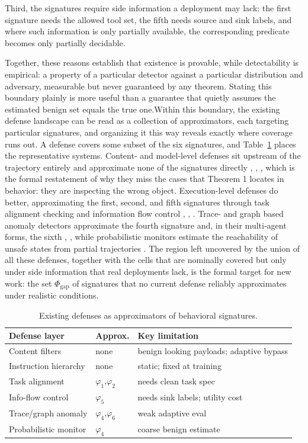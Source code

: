 \documentclass[journal]{IEEEtran}
\theoremstyle{remark}
\begin{document}
Third, the signatures require side information a deployment may lack: the first signature needs the allowed tool set, the fifth needs source and sink labels, and where such information is only partially available, the corresponding predicate becomes only partially decidable.

Together, these reasons establish that existence is provable, while detectability is empirical: a property of a particular detector against a particular distribution and adversary, measurable but never guaranteed by any theorem. Stating this boundary plainly is more useful than a guarantee that quietly assumes the estimated benign set equals the true one.Within this boundary, the existing defense landscape can be read as a collection of approximators, each targeting particular signatures, and organizing it this way reveals exactly where coverage runs out. A defense covers some subset of the six signatures, and Table~\ref{tab:approx} places the representative systems. Content- and model-level defenses sit upstream of the trajectory entirely and approximate none of the signatures directly \cite{r1}, \cite{r2}, \cite{r28}, which is the formal restatement of why they miss the cases that Theorem 1 locates in behavior: they are inspecting the wrong object. Execution-level defenses do better, approximating the first, second, and fifth signatures through task alignment checking and information flow control \cite{r13}, \cite{r15}, \cite{r16}. Trace- and graph based anomaly detectors approximate the fourth signature and, in their multi-agent forms, the sixth \cite{r14}, \cite{r19}, while probabilistic monitors estimate the reachability of unsafe states from partial trajectories \cite{r20}. The region left uncovered by the union of all these defenses, together with the cells that are nominally covered but only under side information that real deployments lack, is the formal target for new work: the set $\Phi_{\mathrm{gap}}$ of signatures that no current defense reliably approximates under realistic conditions.

\begin{table}[t]\centering\caption{Existing defenses as approximators of behavioral signatures.}\label{tab:approx}\footnotesize\begin{tabular}{@{}p{4.2cm}p{2.6cm}p{8.4cm}@{}}\toprule
\textbf{Defense layer} & \textbf{Approx.} & \textbf{Key limitation} \\
\midrule
Content filters \cite{r1,r2} & none & benign looking payloads; adaptive bypass \cite{r5} \\
Instruction hierarchy \cite{r28} & none & static; fixed at training \\
Task alignment \cite{r13} & $\varphi_1$,$\varphi_2$ & needs clean task spec \\
Info-flow control \cite{r15,r16} & $\varphi_5$ & needs sink labels; utility cost \\
Trace/graph anomaly \cite{r14,r19} & $\varphi_4$,$\varphi_6$ & weak adaptive eval \cite{r30} \\
Probabilistic monitor \cite{r20} & $\varphi_4$ & coarse benign estimate \\
\bottomrule\end{tabular}\end{table}
\end{document}
